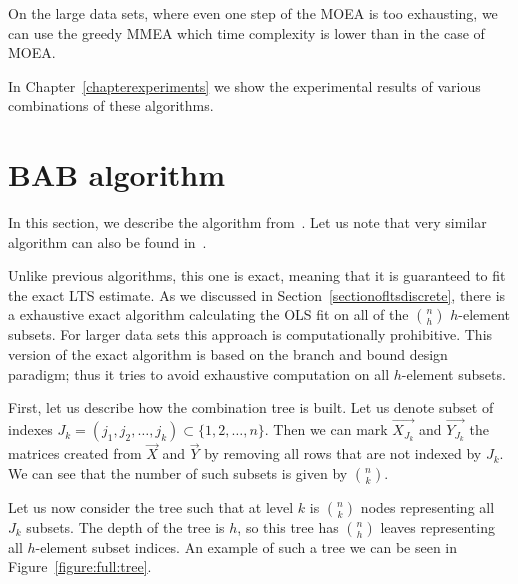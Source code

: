 On the large data sets, where even one step of the MOEA is too exhausting, we can use the greedy MMEA which time complexity is lower than in the case of MOEA.

In Chapter~\ref{chapterexperiments} we show the experimental results of various combinations of these algorithms.





\section{BAB algorithm} \label{sectionbab}
In this section, we describe the algorithm from~\cite{agullo2001new}. Let us note that very similar algorithm can also be found in~\cite{hofmann2010matrix}.

Unlike previous algorithms, this one is exact, meaning that it is guaranteed to fit the exact LTS estimate. As we discussed in Section~\ref{sectionofltsdiscrete}, there is a exhaustive exact algorithm calculating the OLS fit on all of the $\binom{n}{h}$ $h$-element subsets. For larger data sets this approach is computationally prohibitive. This version of the exact algorithm is based on the branch and bound design paradigm; thus it tries to avoid exhaustive computation on all $h$-element subsets. 

First, let us describe how the combination tree is built. 
Let us denote subset of indexes 
$J_k = (j_1, j_2, \ldots , j_k) \subset \{{1,2,\ldots , n\}}$. Then we can mark
$\vec{ X_{J_k} }$ and $\vec{ Y_{J_k} }$ the matrices created from $\vec{X}$
and $\vec{Y}$ by removing all rows that are not indexed by $J_k$.
We can see that the number of such subsets is given by $\binom{n}{k}$.

Let us now consider the tree such that at level $k$ is $\binom{n}{k}$ nodes representing all $J_k$ subsets. The depth of the tree is $h$, so this tree has $\binom{n}{h}$ leaves representing all $h$-element subset indices. An example of such a tree we can be seen in Figure~\ref{figure:full:tree}.

